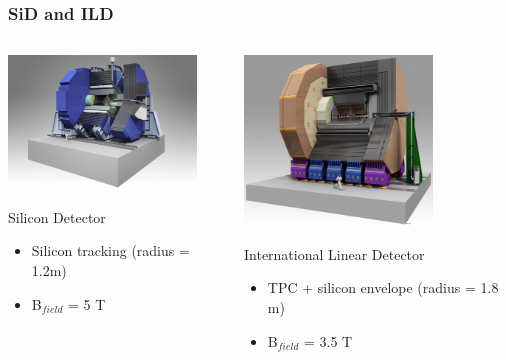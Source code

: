 \documentclass{beamer}
\begin{document}

\begin{frame}
  \frametitle{SiD and ILD}

  \vspace{-0.12cm}
  \begin{columns}[t]
    \begin{column}{5cm}
      \includegraphics[width = 5cm, height = 2.9 cm]{Pictures/ILC_SiD.jpg}
      \vspace{-0.25cm}
      \begin{block}{Silicon Detector}
        \footnotesize{
        \begin{itemize}
          \item Silicon tracking (radius = 1.2m)
          \item B$_{field}$ = 5 T
        \end{itemize}
        }
      \end{block}
    \end{column}

    \begin{column}{5cm}
      \includegraphics[width = 5cm, height = 2.9 cm]{Pictures/ILD_all_110826.jpg}
      \vspace{-0.25cm}
      \begin{block}{International Linear Detector}
        \footnotesize{
        \begin{itemize}
          \item TPC + silicon envelope (radius = 1.8 m)
          \item B$_{field}$ = 3.5 T
        \end{itemize}
        }
      \end{block}
    \end{column}
  \end{columns}


\end{frame}
\end{document}
